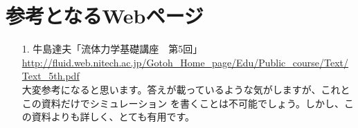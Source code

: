 \documentclass{article}
\begin{document}
\section{ 参考となるWebページ }

\begin{itemize}
\item[1.] 牛島達夫「流体力学基礎講座　第5回」\\ \url{http://fluid.web.nitech.ac.jp/Gotoh_Home_page/Edu/Public_course/Text/Text_5th.pdf}
       \\ 大変参考になると思います。答えが載っているような気がしますが、これとこの資料だけでシミュレーション
	      を書くことは不可能でしょう。しかし、この資料よりも詳しく、とても有用です。
\end{itemize}
\end{document}
